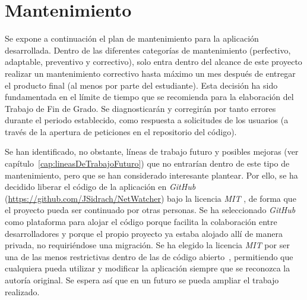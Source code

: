 \chapter{Mantenimiento\label{cap:mantenimiento}}

Se expone a continuación el plan de mantenimiento para la aplicación desarrollada.
Dentro de las diferentes categorías de mantenimiento (perfectivo, adaptable, preventivo y correctivo), solo entra dentro del alcance de este proyecto realizar un mantenimiento correctivo hasta máximo un mes después de entregar el producto final (al menos por parte del estudiante).
Esta decisión ha sido fundamentada en el límite de tiempo que se recomienda para la elaboración del Trabajo de Fin de Grado.
Se diagnosticarán y corregirán por tanto errores durante el periodo establecido, como respuesta a solicitudes de los usuarios (a través de la apertura de peticiones en el repositorio del código).

Se han identificado, no obstante, líneas de trabajo futuro y posibles mejoras (ver capítulo~\ref{cap:lineasDeTrabajoFuturo}) que no entrarían dentro de este tipo de mantenimiento, pero que se han considerado interesante plantear.
Por ello, se ha decidido liberar el código de la aplicación en \textit{GitHub} (\url{https://github.com/JSidrach/NetWatcher}) bajo la licencia \textit{MIT} \cite{mit}, de forma que el proyecto pueda ser continuado por otras personas.
Se ha seleccionado \textit{GitHub} como plataforma para alojar el código porque facilita la colaboración entre desarrolladores y porque el propio proyecto ya estaba alojado allí de manera privada, no requiriéndose una migración.
Se ha elegido la licencia \textit{MIT} por ser una de las menos restrictivas dentro de las de código abierto~\cite{licenses}, permitiendo que cualquiera pueda utilizar y modificar la aplicación siempre que se reconozca la autoría original.
Se espera así que en un futuro se pueda ampliar el trabajo realizado.
